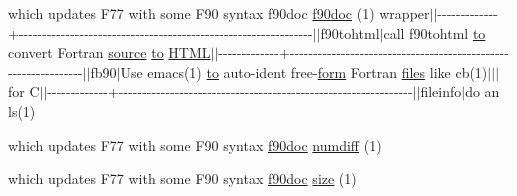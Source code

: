 \begin{DoxyCompactItemize}
\item 
which updates F77 with some F90 syntax f90doc \hyperlink{what__overview_81_8txt_aab2f56fdcdfab484c0d861985675a92f}{f90doc} (1) wrapper$\vert$$\vert$-\/-\/-\/-\/-\/-\/-\/-\/-\/-\/-\/-\/-\/+-\/-\/-\/-\/-\/-\/-\/-\/-\/-\/-\/-\/-\/-\/-\/-\/-\/-\/-\/-\/-\/-\/-\/-\/-\/-\/-\/-\/-\/-\/-\/-\/-\/-\/-\/-\/-\/-\/-\/-\/-\/-\/-\/-\/-\/-\/-\/-\/-\/-\/-\/-\/-\/-\/-\/-\/-\/-\/-\/-\/-\/-\/-\/$\vert$$\vert$f90tohtml$\vert$call f90tohtml \hyperlink{M__stopwatch_83_8txt_a97209fd3e34ef701c0a9734280779cbb}{to} convert Fortran \hyperlink{ufpp__overview_81_8txt_a4d6669ece605d05985c83a04dd38e0ad}{source} \hyperlink{M__stopwatch_83_8txt_a97209fd3e34ef701c0a9734280779cbb}{to} \hyperlink{notes_8txt_a5589c3717ecf4ab40eee95e236b19dad}{H\+T\+ML}$\vert$$\vert$-\/-\/-\/-\/-\/-\/-\/-\/-\/-\/-\/-\/-\/+-\/-\/-\/-\/-\/-\/-\/-\/-\/-\/-\/-\/-\/-\/-\/-\/-\/-\/-\/-\/-\/-\/-\/-\/-\/-\/-\/-\/-\/-\/-\/-\/-\/-\/-\/-\/-\/-\/-\/-\/-\/-\/-\/-\/-\/-\/-\/-\/-\/-\/-\/-\/-\/-\/-\/-\/-\/-\/-\/-\/-\/-\/-\/$\vert$$\vert$fb90$\vert$Use emacs(1) \hyperlink{M__stopwatch_83_8txt_a97209fd3e34ef701c0a9734280779cbb}{to} auto-\/ident free-\/\hyperlink{what__overview_81_8txt_ab6ccd3cf736f24d661599d9ce944e9bf}{form} Fortran \hyperlink{ufpp__overview_81_8txt_a5673f2294ff1627be40c90eae33141ca}{files} like cb(1)$\vert$$\vert$$\vert$for C$\vert$$\vert$-\/-\/-\/-\/-\/-\/-\/-\/-\/-\/-\/-\/-\/+-\/-\/-\/-\/-\/-\/-\/-\/-\/-\/-\/-\/-\/-\/-\/-\/-\/-\/-\/-\/-\/-\/-\/-\/-\/-\/-\/-\/-\/-\/-\/-\/-\/-\/-\/-\/-\/-\/-\/-\/-\/-\/-\/-\/-\/-\/-\/-\/-\/-\/-\/-\/-\/-\/-\/-\/-\/-\/-\/-\/-\/-\/-\/$\vert$$\vert$fileinfo$\vert$do an ls(1)
\item 
which updates F77 with some F90 syntax \hyperlink{what__overview_81_8txt_aab2f56fdcdfab484c0d861985675a92f}{f90doc} \hyperlink{what__overview_81_8txt_a7d9f0f7f68d767709cf298ae59490237}{numdiff} (1)
\item 
which updates F77 with some F90 syntax \hyperlink{what__overview_81_8txt_aab2f56fdcdfab484c0d861985675a92f}{f90doc} \hyperlink{what__overview_81_8txt_ab5692ed87074f1d5ec850a9ffa8b5af9}{size} (1)
\end{DoxyCompactItemize}
